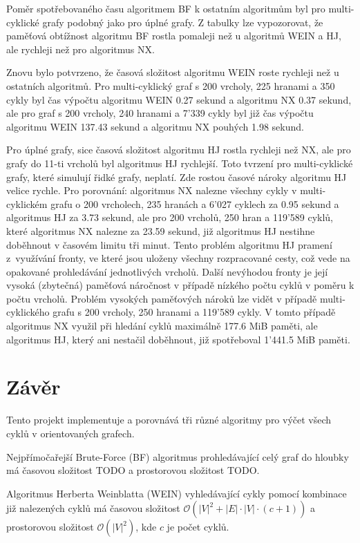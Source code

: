        Poměr spotřebovaného času algoritmem BF k ostatním algoritmům byl pro multi-cyklické grafy podobný jako pro úplné grafy. Z tabulky lze vypozorovat, že paměťová obtížnost algoritmu BF rostla pomaleji než u algoritmů WEIN a HJ, ale rychleji než pro algoritmus NX.

        Znovu bylo potvrzeno, že časová složitost algoritmu WEIN roste rychleji než u ostatních algoritmů. Pro multi-cyklický graf s 200 vrcholy, 225 hranami a 350 cykly byl čas výpočtu algoritmu WEIN 0.27 sekund a algoritmu NX 0.37 sekund, ale pro graf s 200 vrcholy, 240 hranami a 7'339 cykly byl již čas výpočtu algoritmu WEIN 137.43 sekund a algoritmu NX pouhých 1.98 sekund.

        Pro úplné grafy, sice časová složitost algoritmu HJ rostla rychleji než NX, ale pro grafy do 11-ti vrcholů byl algoritmus HJ rychlejší. Toto tvrzení pro multi-cyklické grafy, které simulují řidké grafy, neplatí. Zde rostou časové nároky algoritmu HJ velice rychle. Pro porovnání: algoritmus NX nalezne všechny cykly v multi-cyklickém grafu o 200 vrcholech, 235 hranách a 6'027 cyklech za 0.95 sekund a algoritmus HJ za 3.73 sekund, ale pro 200 vrcholů, 250 hran a 119'589 cyklů, které algoritmus NX nalezne za 23.59 sekund, již algoritmus HJ nestihne doběhnout v časovém limitu tři minut. Tento problém algoritmu HJ pramení z~využívání fronty, ve které jsou uloženy všechny rozpracované cesty, což vede na opakované prohledávání jednotlivých vrcholů. Další nevýhodou fronty je její vysoká (zbytečná) paměťová náročnost v případě nízkého počtu cyklů v poměru k počtu vrcholů. Problém vysokých paměťových nároků lze vidět v případě multi-cyklického grafu s 200 vrcholy, 250 hranami a 119'589 cykly. V tomto případě algoritmus NX využil při hledání cyklů maximálně 177.6 MiB paměti, ale algoritmus HJ, který ani nestačil doběhnout, již spotřeboval 1'441.5 MiB paměti.

\chapter{Závěr}
    \label{chapter:Conclusion}
    Tento projekt implementuje a porovnává tři různé algoritmy pro výčet všech cyklů v orientovaných grafech.

    Nejpřímočařejší Brute-Force (BF) algoritmus prohledávající celý graf do hloubky má časovou složitost TODO a prostorovou složitost TODO.

    Algoritmus Herberta Weinblatta (WEIN) vyhledávající cykly pomocí kombinace již nalezených cyklů má časovou složitost $\mathcal{O}(|V|^2+|E|\cdot|V|\cdot(c + 1))$ a prostorovou složitost $\mathcal{O}(|V|^2)$, kde $c$ je počet cyklů.

